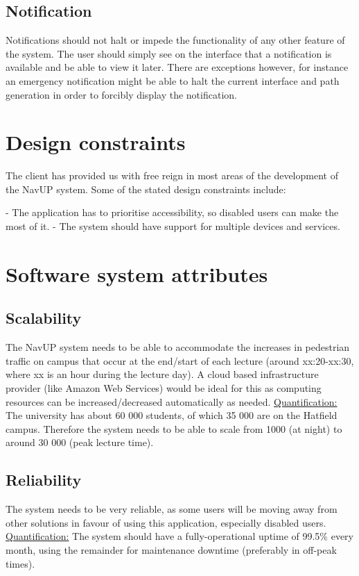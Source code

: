 \documentclass[english]{article}
\begin{document}
	\subsection{Notification}
Notifications should not halt or impede the functionality of any other feature of the system. The user should simply see on the interface that a notification is available and be able to view it later. There are exceptions however, for instance an emergency notification might be able to halt the current interface and path generation in order to forcibly display the notification. 
	\section{Design constraints}
	The client has provided us with free reign in most areas of the development of the NavUP system. Some of the stated design constraints include:
	
		- The application has to prioritise accessibility, so disabled users can make the most of it.
		- The system should have support for multiple devices and services.

	\section{Software system attributes}
	\subsection{Scalability}
	The NavUP system needs to be able to accommodate the increases in pedestrian traffic on campus that occur at the end/start of each lecture (around xx:20-xx:30, where xx is an hour during the lecture day). A cloud based infrastructure provider (like Amazon Web Services) would be ideal for this as computing resources can be increased/decreased automatically as needed.
	\newline
	\newline
	\underline{Quantification:} The university has about 60 000 students, of which 35 000 are on the Hatfield campus. Therefore the system needs to be able to scale from 1000 (at night) to around 30 000 (peak lecture time).
	\subsection{Reliability}
	The system needs to be very reliable, as some users will be moving away from other solutions in favour of using this application, especially disabled users.
	\newline
	\newline
	\underline{Quantification:} The system should have a fully-operational uptime of 99.5\% every month, using the remainder for maintenance downtime (preferably in off-peak times).
\end{document}
